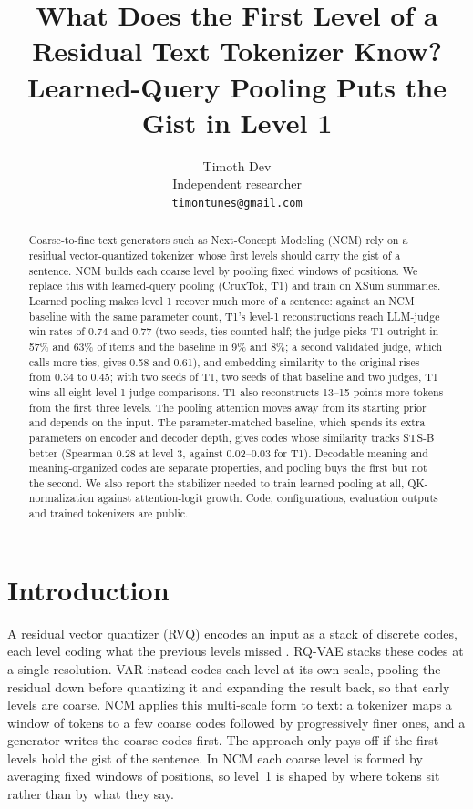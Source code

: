 \documentclass[11pt]{article}
\title{What Does the First Level of a Residual Text Tokenizer Know?\\[0.3em]
\large Learned-Query Pooling Puts the Gist in Level 1}
\author{Timoth Dev\\Independent researcher\\\texttt{timontunes@gmail.com}}
\date{}
\begin{document}
\maketitle

\begin{abstract}
Coarse-to-fine text generators such as Next-Concept Modeling (NCM) rely on a residual vector-quantized tokenizer whose first levels should carry the gist of a sentence. NCM builds each coarse level by pooling fixed windows of positions. We replace this with learned-query pooling (CruxTok, T1) and train on XSum summaries. Learned pooling makes level 1 recover much more of a sentence: against an NCM baseline with the same parameter count, T1's level-1 reconstructions reach LLM-judge win rates of 0.74 and 0.77 (two seeds, ties counted half; the judge picks T1 outright in 57\% and 63\% of items and the baseline in 9\% and 8\%; a second validated judge, which calls more ties, gives 0.58 and 0.61), and embedding similarity to the original rises from 0.34 to 0.45; with two seeds of T1, two seeds of that baseline and two judges, T1 wins all eight level-1 judge comparisons. T1 also reconstructs 13--15 points more tokens from the first three levels. The pooling attention moves away from its starting prior and depends on the input. The parameter-matched baseline, which spends its extra parameters on encoder and decoder depth, gives codes whose similarity tracks STS-B better (Spearman 0.28 at level 3, against 0.02--0.03 for T1). Decodable meaning and meaning-organized codes are separate properties, and pooling buys the first but not the second. We also report the stabilizer needed to train learned pooling at all, QK-normalization against attention-logit growth. Code, configurations, evaluation outputs and trained tokenizers are public.
\end{abstract}

\section{Introduction}
A residual vector quantizer (RVQ) encodes an input as a stack of discrete codes, each level coding what the previous levels missed \citep{vandenoord2017vqvae,zeghidour2021soundstream}. RQ-VAE \citep{lee2022rqvae} stacks these codes at a single resolution. VAR \citep{tian2024var} instead codes each level at its own scale, pooling the residual down before quantizing it and expanding the result back, so that early levels are coarse. NCM \citep{kumbong2026nextconcept} applies this multi-scale form to text: a tokenizer maps a window of tokens to a few coarse codes followed by progressively finer ones, and a generator writes the coarse codes first. The approach only pays off if the first levels hold the gist of the sentence. In NCM each coarse level is formed by averaging fixed windows of positions, so level~1 is shaped by where tokens sit rather than by what they say.
\end{document}
